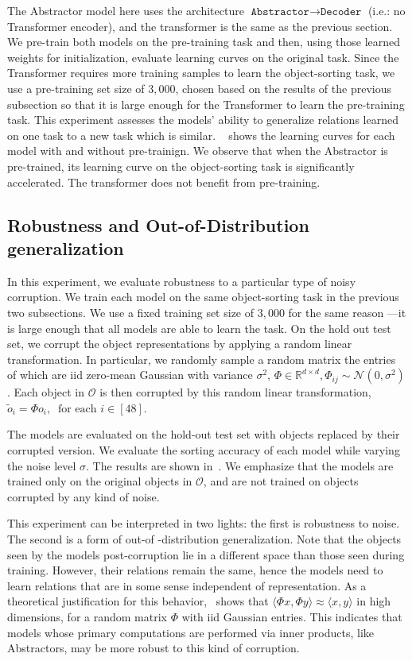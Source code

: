 The Abstractor model here uses the architecture $\texttt{Abstractor} \to \texttt{Decoder}$ (i.e.: no Transformer
encoder), and the transformer is the same as the previous section. We pre-train both models on the pre-training task
and then, using those learned weights for initialization, evaluate learning curves on the original task. Since the
Transformer requires more training samples to learn the object-sorting task, we use a pre-training set size of $3,000$, chosen based on the results of the previous subsection so that it is large enough for the Transformer to learn the pre-training task. This experiment assesses the models' ability to generalize relations learned on one task to a new task which is similar. ~ shows the learning curves for each model with and without pre-trainign. We observe that when the Abstractor is pre-trained, its learning curve on the object-sorting task is significantly accelerated. The transformer does not benefit from pre-training.

\subsection{Robustness and Out-of-Distribution generalization}
In this experiment, we evaluate robustness to a particular type of noisy corruption. We train each model on the same
object-sorting task in the previous two subsections. We use a fixed training set size of $3,000$ for the same reason
---it is large enough that all models are able to learn the task. On the hold out test set, we corrupt the object
representations by applying a random linear transformation. In particular, we randomly sample a random matrix the
entries of which are iid zero-mean Gaussian with variance $\sigma^2$, $\Phi \in \mathbb{R}^{d \times d}, \Phi_{ij} \sim \mathcal{N}(0, \sigma^2)$. Each object in $\mathcal{O}$ is then corrupted by this random linear transformation,
$\tilde{o}_i = \Phi o_i, \ \text{ for each } i \in [48]$.

The models are evaluated on the hold-out test set with objects replaced by their corrupted version. We evaluate the sorting accuracy of each model while varying the noise level $\sigma$. The results are shown in~. We emphasize that the models are trained only on the original objects in $\mathcal{O}$, and are not trained on objects corrupted by any kind of noise.

This experiment can be interpreted in two lights: the first is robustness to noise. The second is a form of out-of
-distribution generalization. Note that the objects seen by the models post-corruption lie in a different space than
those seen during training. However, their relations remain the same, hence the models need to learn relations that
are in some sense independent of representation.
As a theoretical justification for this behavior,~\cite{zhouCompressedPrivacySensitive2009} shows that $\langle \Phi x, \Phi y \rangle \approx \langle x, y \rangle$ in high dimensions, for a random matrix $\Phi$ with iid Gaussian entries. This indicates that models whose primary computations are performed via inner products, like Abstractors, may be more robust to this kind of corruption.

